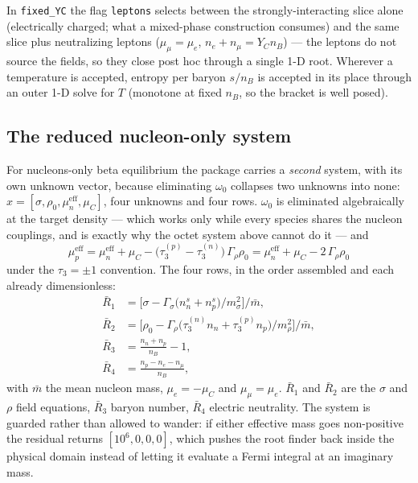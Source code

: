 \documentclass[aps,prc,onecolumn,superscriptaddress,nofootinbib,10pt]{revtex4-2}
\newcommand{\nB}{n_B}
\newcommand{\muC}{\mu_C}
\newcommand{\mueff}[1]{\mu^{\mathrm{eff}}_{#1}}
\begin{document}
%
In \texttt{fixed\_YC} the flag \texttt{leptons} selects between the
strongly-interacting slice alone (electrically charged; what a mixed-phase
construction consumes) and the same slice plus neutralizing leptons
($\mu_\mu = \mu_e$, $n_e + n_\mu = Y_C \nB$) --- the leptons do not source
the fields, so they close post hoc through a single 1-D root. Wherever a
temperature is accepted, entropy per baryon $s/\nB$ is accepted in its place
through an outer 1-D solve for $T$ (monotone at fixed $\nB$, so the bracket
is well posed).

\subsection{The reduced nucleon-only system}
\label{sec:reduced}

For nucleons-only beta equilibrium the package carries a \emph{second} system,
with its own unknown vector, because eliminating $\omega_0$ collapses two
unknowns into none: $x = [\sigma, \rho_0, \mueff{n}, \muC]$, four unknowns and
four rows. $\omega_0$ is eliminated algebraically at the target density ---
which works only while every species shares the nucleon couplings, and is
exactly why the octet system above cannot do it --- and
%
\begin{equation}
\mueff{p} = \mueff{n} + \muC
            - \big(\tau_3^{(p)} - \tau_3^{(n)}\big)\, \Gamma_\rho \rho_0
          = \mueff{n} + \muC - 2\,\Gamma_\rho \rho_0
\end{equation}
%
under the $\tau_3 = \pm 1$ convention. The four rows, in the order assembled
and each already dimensionless:
%
\begin{align}
\bar R_1 &= \Big[ \sigma
   - \Gamma_\sigma \big( n^s_n + n^s_p \big) \big/ m_\sigma^2 \Big]
   \big/ \bar m , \\
\bar R_2 &= \Big[ \rho_0
   - \Gamma_\rho \big( \tau_3^{(n)} n_n + \tau_3^{(p)} n_p \big)
     \big/ m_\rho^2 \Big] \big/ \bar m , \\
\bar R_3 &= \frac{n_n + n_p}{\nB} - 1 , \\
\bar R_4 &= \frac{n_p - n_e - n_\mu}{\nB} ,
\end{align}
%
with $\bar m$ the mean nucleon mass, $\mu_e = -\muC$ and
$\mu_\mu = \mu_e$. $\bar R_1$ and $\bar R_2$ are the $\sigma$ and $\rho$ field
equations, $\bar R_3$ baryon number, $\bar R_4$ electric neutrality. The
system is guarded rather than allowed to wander: if either effective mass goes
non-positive the residual returns $[10^6, 0, 0, 0]$, which pushes the root
finder back inside the physical domain instead of letting it evaluate a Fermi
integral at an imaginary mass.
\end{document}
